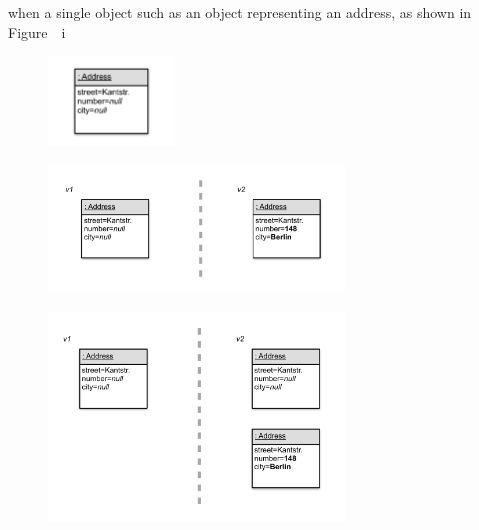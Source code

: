 









when a single object such as an object representing an address, as shown in Figure~\, i

\begin{figure}[h]
    \centering
    \includegraphics[width=0.3\textwidth]{figures/4_approach/1_singleObject.pdf}
    \caption{}
    \label{fig:SingleObject}
\end{figure}

\begin{figure}[h]
    \centering
    \includegraphics[width=0.7\textwidth]{figures/4_approach/2_objectChange.pdf}
    \caption{}
    \label{fig:ObjectChanged}
\end{figure}

\begin{figure}[h]
    \centering
    \includegraphics[width=0.7\textwidth]{figures/4_approach/3_previousVersionPreserved.pdf}
    \caption{}
    \label{fig:VersionPreserved}
\end{figure}

